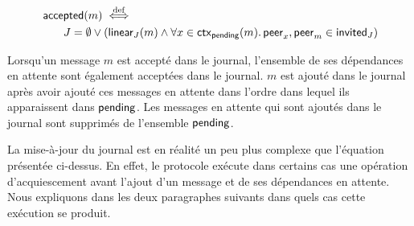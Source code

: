 \begin{equation*}\begin{split}
    \MoveEqLeft\trm{accepted}(m) \defiff\\
    &J = \emptyset \lor (\trm{linear}_J(m) \land \forall x \in \trm{ctx}_{\trm{pending}}(m) \qsep \trm{peer}_x, \trm{peer}_m \in \trm{invited}_J)
\end{split}\end{equation*}

Lorsqu'un message $m$ est accepté dans le journal, l'ensemble de ses dépendances en attente sont également acceptées dans le journal.
$m$ est ajouté dans le journal après avoir ajouté ces messages en attente dans l'ordre dans lequel ils apparaissent dans $\operatorname{\mathsf{pending}}$.
Les messages en attente qui sont ajoutés dans le journal sont supprimés de l'ensemble $\operatorname{\mathsf{pending}}$.



La mise-à-jour du journal est en réalité un peu plus complexe que l'équation présentée ci-dessus.
En effet, le protocole exécute dans certains cas une opération d'acquiescement avant l'ajout d'un message et de ses dépendances en attente.
Nous expliquons dans les deux paragraphes suivants dans quels cas cette exécution se produit.

